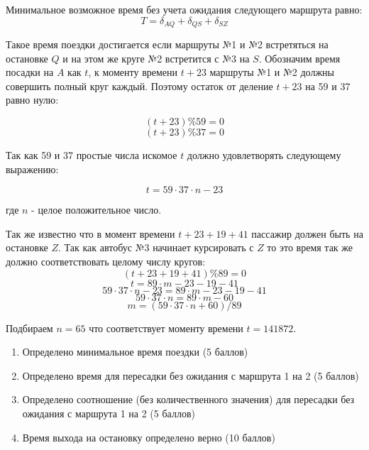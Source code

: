 \solutionSection
Минимальное возможное время без учета ожидания следующего маршрута равно:
\[ T = \delta_{AQ} + \delta_{QS} + \delta_{SZ}\]

Такое время поездки достигается если маршруты №1 и №2 встретяться на остановке $Q$ и на этом же круге №2 встретится с №3 на $S$. Обозначим время посадки на $A$ как $t$, к моменту времени $t+23$ маршруты №1 и №2 должны совершить полный круг каждый. Поэтому остаток от деление $t+23$ на 59 и 37 равно нулю:

\[ (t + 23) \% 59 = 0\]
\[ (t + 23) \% 37 = 0\]

Так как 59 и 37 простые числа искомое $t$ должно удовлетворять следующему выражению:

\[ t = 59 \cdot 37 \cdot n - 23\]

где $n$ - целое положительное число.

Так же известно что в момент времени $t+23+19+41$ пассажир должен быть на остановке $Z$. Так как автобус №3 начинает курсировать с $Z$ то это время так же должно соответствовать целому числу кругов:
\[ (t + 23 + 19 + 41) \% 89 = 0\]
\[ t = 89 \cdot m - 23 - 19 - 41\]
\[ 59 \cdot 37 \cdot n - 23 = 89 \cdot m - 23 - 19 - 41\]
\[ 59 \cdot 37 \cdot n = 89 \cdot m - 60\]
\[ m = (59 \cdot 37 \cdot n + 60)/89 \]

Подбираем $n=65$ что соответствует моменту времени $t = 141872$.


\markSection

\begin{enumerate}
    \item Определено минимальное время поездки (5 баллов) 
    \item Определено время для пересадки без ожидания с маршрута 1 на 2 (5 баллов)
    \item Определено соотношение (без количественного значения) для пересадки без ожидания с маршрута 1 на 2 (5 баллов)
    \item Время выхода на остановку определено верно (10 баллов)
\end{enumerate}